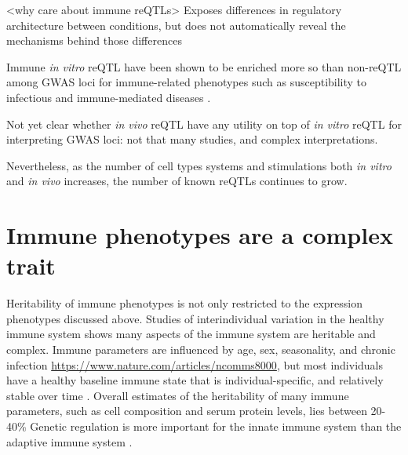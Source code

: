 \begin{outline}
\1 <why care about immune reQTLs>
    \2 Exposes differences in regulatory architecture between conditions, but does not automatically reveal the mechanisms behind those differences 

    \2 Immune \textit{in vitro} \gls{reQTL} have been shown to be enriched more so than non-\gls{reQTL} among GWAS loci for immune-related phenotypes such as
    susceptibility to infectious \autocite{barreiro2012DecipheringGeneticArchitecture,manry2017DecipheringGeneticControl}
    and immune-mediated diseases \autocite{manry2017DecipheringGeneticControl,kim-hellmuth2017GeneticRegulatoryEffects}.

    \2 Not yet clear whether \textit{in vivo} reQTL have any utility on top of \textit{in vitro} reQTL for interpreting GWAS loci: not that many studies, and complex interpretations.

    \2 Nevertheless, as the number of cell types systems and stimulations both \textit{in vitro} and \textit{in vivo} increases, the number of known reQTLs continues to grow.

\section{Immune phenotypes are a complex trait}

\1 Heritability of immune phenotypes is not only restricted to the expression phenotypes discussed above.
    \2 Studies of interindividual variation in the healthy immune system shows many aspects of the immune system are heritable and complex.
    \2 Immune parameters are influenced by age, sex, seasonality, and chronic infection \autocite{brodin2015VariationHumanImmune,liston2016ShapingVariationHuman,brodin2017HumanImmuneSystem,patin2018NaturalVariationParameters,liston2018OriginsDiversityHuman} \url{https://www.nature.com/articles/ncomms8000},
    but most individuals have a healthy baseline immune state that is individual-specific, 
    and relatively stable over time \autocite{liston2016ShapingVariationHuman,brodin2017HumanImmuneSystem,lakshmikanth2020HumanImmuneSystem}.
    \2 Overall estimates of the heritability of many immune parameters, such as cell composition and serum protein levels, lies between 20-40\% \autocite{liston2016ShapingVariationHuman,brodin2017HumanImmuneSystem,patin2018NaturalVariationParameters,liston2018OriginsDiversityHuman}
    \2 Genetic regulation is more important for the innate immune system than the adaptive immune system \autocite{patin2018NaturalVariationParameters}.


\end{outline}
